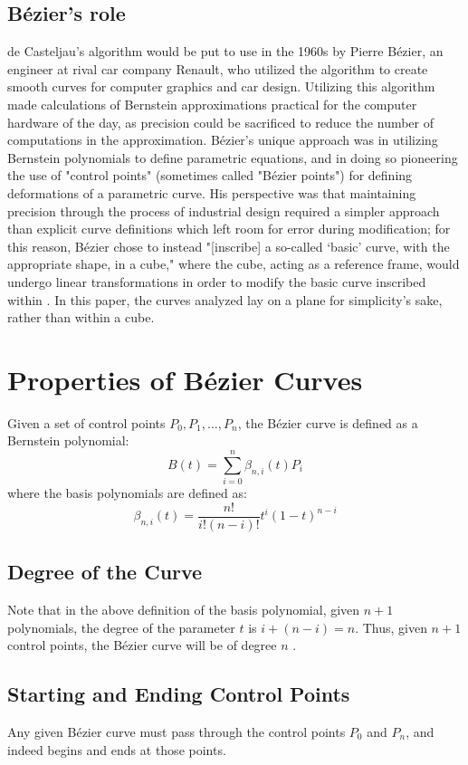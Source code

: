 \documentclass{article}
\begin{document}
\subsection{Bézier's role}
de Casteljau's algorithm would be put to use in the 1960s by Pierre Bézier, an engineer at rival car company Renault, who utilized the algorithm to create smooth curves for computer graphics and car design. Utilizing this algorithm made calculations of Bernstein approximations practical for the computer hardware of the day, as precision could be sacrificed to reduce the number of computations in the approximation. Bézier's unique approach was in utilizing Bernstein polynomials to define parametric equations, and in doing so pioneering the use of "control points" (sometimes called "Bézier points") for defining deformations of a parametric curve. His perspective was that maintaining precision through the process of industrial design required a simpler approach than explicit curve definitions which left room for error during modification; for this reason, Bézier chose to instead "[inscribe] a so-called ‘basic’ curve, with the appropriate shape, in a cube," where the cube, acting as a reference frame, would undergo linear transformations in order to modify the basic curve inscribed within \cite{rabut02}. In this paper, the curves analyzed lay on a plane for simplicity's sake, rather than within a cube.

\pagebreak

\section{Properties of Bézier Curves}
Given a set of control points $P_0, P_1, \dots, P_n$, the Bézier curve is defined as a Bernstein polynomial: $$B(t)=\sum_{i=0}^n\beta_{n,i}(t)P_i$$ where the basis polynomials are defined as: $$\beta_{n,i}(t)=\frac{n!}{i!(n-i)!}t^i(1-t)^{n-i}$$ \cite{shene11}


\subsection{Degree of the Curve}
Note that in the above definition of the basis polynomial, given $n+1$ polynomials, the degree of the parameter $t$ is $i + (n-i) = n$. Thus, given $n+1$ control points, the Bézier curve will be of degree $n$ \cite{shene11}.

\subsection{Starting and Ending Control Points}
Any given Bézier curve must pass through the control points $P_0$ and $P_n$, and indeed begins and ends at those points. 
\end{document}
